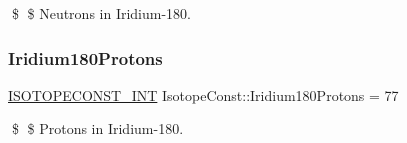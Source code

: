 \$ \$ Neutrons in Iridium-\/180. \mbox{\label{group___isotope_const-_iridium-_ir180_ga52ac5f527bbc9c90433602c8fb22c072}} 
\subsubsection{\texorpdfstring{Iridium180\+Protons}{Iridium180Protons}}
{\footnotesize\ttfamily \mbox{\hyperlink{group___isotope_const-_macros_ga5f18360b3e99483a35c32d789e62621c}{I\+S\+O\+T\+O\+P\+E\+C\+O\+N\+S\+T\+\_\+\+I\+NT}} Isotope\+Const\+::\+Iridium180\+Protons = 77}

\$ \$ Protons in Iridium-\/180. 